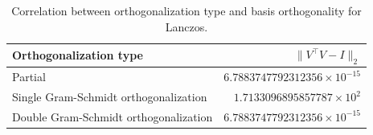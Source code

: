 \begin{table}[htbp]
\caption{Correlation between orthogonalization type and basis orthogonality for Lanczos.}
\centering
\label{table:orthog}
\begin{tabular}{lr}
\hline
\textbf{Orthogonalization type} & $ \|V^{\top}V - I\|_2 $ \\
\hline
Partial & $6.7883747792312356 \times 10^{-15}$ \\
Single Gram-Schmidt orthogonalization & $1.7133096895857787 \times 10^{2}$ \\
Double Gram-Schmidt orthogonalization & $6.7883747792312356 \times 10^{-15}$ \\
\hline
\end{tabular}
\end{table}
